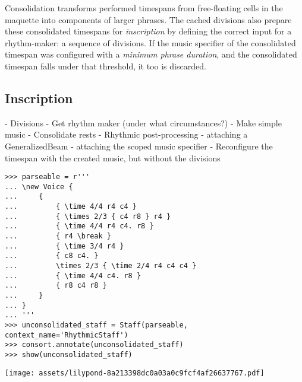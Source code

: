 \noindent Consolidation transforms performed timespans from free-floating cells
in the maquette into components of larger phrases. The cached divisions also
prepare these consolidated timespans for \emph{inscription} by defining the
correct input for a rhythm-maker: a sequence of divisions. If the music
specifier of the consolidated timespan was configured with a \emph{minimum
phrase duration}, and the consolidated timespan falls under that threshold, it
too is discarded.

\subsection{Inscription}
\label{ssec:inscription}

\begin{markdown}
-   Divisions
-   Get rhythm maker (under what circumstances?)
-   Make simple music
-   Consolidate rests
-   Rhythmic post-processing
    -   attaching a GeneralizedBeam
    -   attaching the scoped music specifier
-   Reconfigure the timespan with the created music, but without the divisions
\end{markdown}

\begin{comment}
<abjad>
parseable = r'''
\new Voice {
    {
        { \time 4/4 r4 c4 }
        { \times 2/3 { c4 r8 } r4 }
        { \time 4/4 r4 c4. r8 }
        { r4 \break }
        { \time 3/4 r4 }
        { c8 c4. }
        \times 2/3 { \time 2/4 r4 c4 c4 }
        { \time 4/4 c4. r8 }
        { r8 c4 r8 }
    }
}
'''
unconsolidated_staff = Staff(parseable, context_name='RhythmicStaff')
consort.annotate(unconsolidated_staff)
show(unconsolidated_staff)
</abjad>
\end{comment}

\begin{abjadbookoutput}
\begin{singlespacing}
\vspace{-0.5\baselineskip}
\begin{lstlisting}
>>> parseable = r'''
... \new Voice {
...     {
...         { \time 4/4 r4 c4 }
...         { \times 2/3 { c4 r8 } r4 }
...         { \time 4/4 r4 c4. r8 }
...         { r4 \break }
...         { \time 3/4 r4 }
...         { c8 c4. }
...         \times 2/3 { \time 2/4 r4 c4 c4 }
...         { \time 4/4 c4. r8 }
...         { r8 c4 r8 }
...     }
... }
... '''
>>> unconsolidated_staff = Staff(parseable, context_name='RhythmicStaff')
>>> consort.annotate(unconsolidated_staff)
>>> show(unconsolidated_staff)
\end{lstlisting}
\noindent\texttt{[image: assets/lilypond-8a213398dc0a03a0c9fcf4af26637767.pdf]}
\end{singlespacing}
\end{abjadbookoutput}

